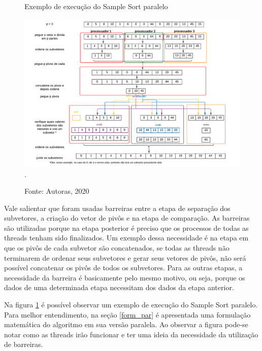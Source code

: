 \documentclass[journal]{IEEEtran}
\begin{document}
\begin{figure}[!htbp]
    \centering
    \caption{Exemplo de execução do Sample Sort paralelo}
    \centering
    \includegraphics[width=6in]{IEEEtran/imagens/samplesortparalelo}
    \DeclareGraphicsExtensions.
     \caption*{Fonte: Autoras, 2020}
    \label{fig:paralelo}
\end{figure}

Vale salientar que foram usadas barreiras entre a etapa de separação dos subvetores, a criação do vetor de pivôs e na etapa de comparação. As barreiras são utilizadas porque na etapa posterior é preciso que os processos de todas as threads tenham sido finalizados. Um exemplo dessa necessidade é na etapa em que os pivôs de cada subvetor são concatenados, se todas as threads não terminarem de ordenar seus subvetores e gerar seus vetores de pivôs, não será possível concatenar os pivôs de todos os subvetores. Para as outras etapas, a necessidade da barreira é basicamente pelo mesmo motivo, ou seja, porque os dados de uma determinada etapa necessitam dos dados da etapa anterior.

 Na figura \ref{fig:paralelo} é possível observar um exemplo de execução do Sample Sort paralelo. Para melhor entendimento, na seção \ref{form_par} é apresentada uma formulação matemática do algoritmo em sua versão paralela. Ao observar a figura pode-se notar como as threads irão funcionar e ter uma ideia da necessidade da utilização de barreiras.
\end{document}
